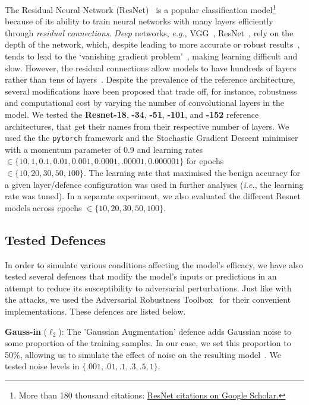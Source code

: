 The Residual Neural Network (ResNet)~\cite{resnet} is a popular classification model\footnote{More than 180 thousand citations: \href{https://scholar.google.com/scholar?cites=9281510746729853742}{ResNet citations on Google Scholar.}} because of its ability to train neural networks with many layers efficiently through \textit{residual connections}.
\textit{Deep} networks, \textit{e.g.}, VGG~\cite{vgg}, ResNet~\cite{resnet}, rely on the depth of the network, which, despite leading to more accurate or robust results~\cite{rolnick2017power, carlini_towards_2017}, tends to lead to the `vanishing gradient problem'~\cite{hochreiter1998vanishing}, making learning difficult and slow. However, the residual connections allow models to have hundreds of layers rather than tens of layers~\cite{resnet,vgg}. Despite the prevalence of the reference architecture, several modifications have been proposed that trade off, for instance, robustness and computational cost by varying the number of convolutional layers in the model. We tested the \textbf{Resnet-18}, \textbf{-34}, \textbf{-51}, \textbf{-101}, and \textbf{-152} reference architectures, that get their names from their respective number of layers. We used the the \texttt{pytorch} framework and the Stochastic Gradient Descent minimiser with a momentum parameter of 0.9 and learning rates $\in \{10, 1, 0.1, 0.01, 0.001, 0.0001, .00001, 0.000001\}$ for epochs $\in \{ 10, 20, 30, 50, 100\}$. The learning rate that maximised the benign accuracy for a given layer/defence configuration was used in further analyses (\textit{i.e.}, the learning rate was tuned). In a separate experiment, we also evaluated the different Resnet models across epochs $\in \{10, 20, 30, 50, 100\}$.

\subsection{Tested Defences}
\label{defences}

In order to simulate various conditions affecting the model's efficacy, we have also tested several defences that modify the model's inputs or predictions in an attempt to reduce its susceptibility to adversarial perturbations. Just like with the attacks, we used the Adversarial Robustness Toolbox~\cite{art2018} for their convenient implementations. These defences are listed below.

\textbf{Gauss-in} ($\ell_2$): The 'Gaussian Augmentation' defence adds Gaussian noise to some proportion of the training samples. In our case, we set this proportion to 50\%, allowing us to simulate the effect of noise on the resulting model~\cite{gauss_aug}. We tested noise levels in $\{.001, .01, .1, .3, .5, 1\}$.

